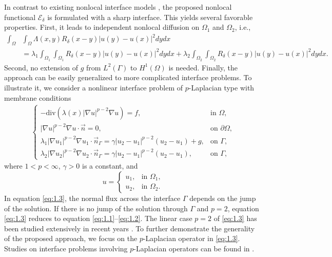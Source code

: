 \documentclass{article}
\theoremstyle{definition}
\begin{document}
In contrast to existing nonlocal interface models \cite{alali2015peridynamics,capodaglio2020energy,seleson2013interface}, the proposed nonlocal functional $\mathcal{E}_\delta$ is formulated with a sharp interface.
This yields several favorable properties.
First, it leads to independent nonlocal diffusion on $\Omega_1$ and $\Omega_2$, i.e.,
\begin{align*}
\int_\Omega&\int_\Omega \Lambda(x,y) R_\delta(x-y)|u(y)-u(x)|^2dydx\\
&=\lambda_1\int_{\Omega_1}\int_{\Omega_1}R_\delta(x-y)|u(y)-u(x)|^2dydx
+\lambda_2\int_{\Omega_2}\int_{\Omega_2}R_\delta(x-y)|u(y)-u(x)|^2dydx.
\end{align*}
Second, no extension of $g$ from $L^2(\Gamma)$ to $H^1(\Omega)$ is needed.
Finally, the approach can be easily generalized to more complicated interface problems.
To illustrate it, we consider a nonlinear interface problem of $p$-Laplacian type with membrane conditions
\begin{align}\label{eq:1.3}
\begin{cases}
-\mbox{div}(\lambda(x)|\nabla u|^{p-2}\nabla u)=f, & \mbox{in } \Omega, \\
|\nabla u|^{p-2}\nabla u\cdot\vec{n}=0, & \mbox{on } \partial\Omega, \\
\lambda_1 |\nabla u_1|^{p-2}\nabla u_1\cdot \vec{n}_\Gamma
=\gamma |u_2-u_1|^{p-2}(u_2-u_1)+g, & \mbox{on } \Gamma, \\
\lambda_2 |\nabla u_2|^{p-2}\nabla u_2\cdot \vec{n}_\Gamma
=\gamma |u_2-u_1|^{p-2}(u_2-u_1), & \mbox{on } \Gamma,
\end{cases}
\end{align}
where $1<p<\infty$, $\gamma>0$ is a constant, and
\[
u=
\begin{cases}
u_1, & \text{in } \Omega_1, \\
u_2, & \text{in } \Omega_2.
\end{cases}
\]
In equation \eqref{eq:1.3}, the normal flux across the interface $\Gamma$ depends on the jump of the solution.
If there is no jump of the solution through $\Gamma$ and $p=2$, equation \eqref{eq:1.3} reduces to equation \eqref{eq:1.1}--\eqref{eq:1.2}.
The linear case $p=2$ of \eqref{eq:1.3} has been studied extensively in recent years
\cite{dorfler2020elliptic,maia2023some,ciavolella2021existence,maia2024generalized}.
To further demonstrate the generality of the proposed approach, we focus on the $p$-Laplacian operator in \eqref{eq:1.3}.
Studies on interface problems involving $p$-Laplacian operators can be found in
\cite{gwinner2024optimal,borsuk2024interface}.
\end{document}

